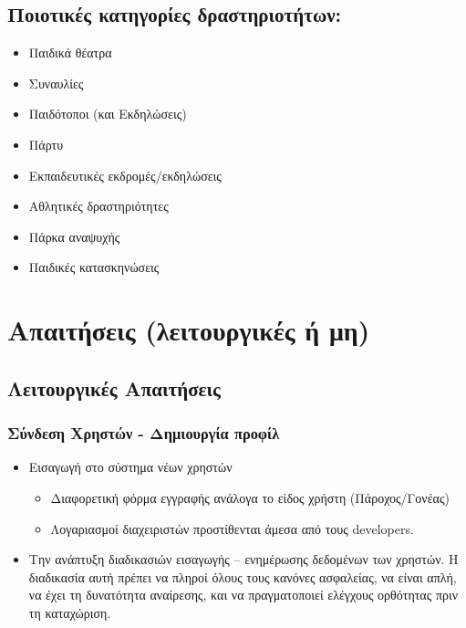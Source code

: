 \documentclass[letterpaper,6pt]{article}
\begin{document}
\subsection{Ποιοτικές κατηγορίες δραστηριοτήτων:}
\begin{itemize}
  \item Παιδικά θέατρα
  \item Συναυλίες
  \item Παιδότοποι (και Εκδηλώσεις) 
  \item Πάρτυ
  \item Εκπαιδευτικές εκδρομές/εκδηλώσεις
  \item Αθλητικές δραστηριότητες
  \item Πάρκα αναψυχής
  \item Παιδικές κατασκηνώσεις
\end{itemize}


\section{Απαιτήσεις (λειτουργικές ή μη)}

\subsection{Λειτουργικές Απαιτήσεις}

\subsubsection{Σύνδεση Χρηστών - Δημιουργία προφίλ}

\begin{itemize}
  \item Εισαγωγή στο σύστημα νέων χρηστών
    \begin{itemize}
      \item Διαφορετική φόρμα εγγραφής ανάλογα το είδος χρήστη (Πάροχος/Γονέας)
       \item Λογαριασμοί διαχειριστών προστίθενται άμεσα από τους developers.
    \end{itemize}
  \item Την ανάπτυξη διαδικασιών εισαγωγής – ενημέρωσης δεδομένων των χρηστών. Η διαδικασία αυτή πρέπει να πληροί όλους τους κανόνες ασφαλείας, να είναι απλή, να έχει τη δυνατότητα αναίρεσης, και να πραγματοποιεί ελέγχους ορθότητας πριν τη καταχώριση.
\end{itemize}
\end{document}

